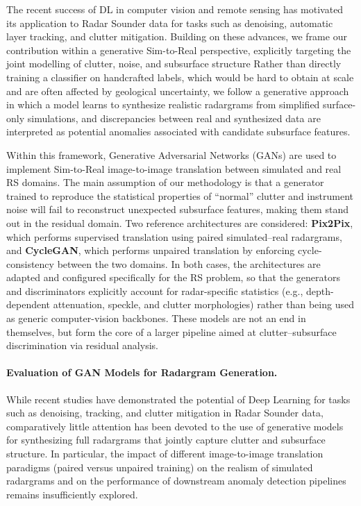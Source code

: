 The recent success of DL in computer vision and remote sensing has motivated its application to Radar Sounder data for tasks such as denoising, automatic layer tracking, and clutter mitigation.
Building on these advances, we frame our contribution within a generative Sim-to-Real perspective, explicitly targeting the joint modelling of clutter, noise, and subsurface structure
Rather than directly training a classifier on handcrafted labels, which would be hard to obtain at scale and are often affected by geological uncertainty, we follow a generative approach in which a model learns to synthesize realistic radargrams from simplified surface-only simulations, and discrepancies between real and synthesized data are interpreted as potential anomalies associated with candidate subsurface features.

Within this framework, Generative Adversarial Networks (GANs)\cite{Goodfellow_2014} are used to implement Sim-to-Real image-to-image translation between simulated and real RS domains.
The main assumption of our methodology is that a generator trained to reproduce the statistical properties of \enquote{normal} clutter and instrument noise will fail to reconstruct unexpected subsurface features, making them stand out in the residual domain.
Two reference architectures are considered: \textbf{Pix2Pix}\cite{Isola_2017}, which performs supervised translation using paired simulated–real radargrams, and \textbf{CycleGAN}\cite{Zhu_2017}, which performs unpaired translation by enforcing cycle-consistency between the two domains.
In both cases, the architectures are adapted and configured specifically for the RS problem, so that the generators and discriminators explicitly account for radar-specific statistics (e.g., depth-dependent attenuation, speckle, and clutter morphologies) rather than being used as generic computer-vision backbones.
These models are not an end in themselves, but form the core of a larger pipeline aimed at clutter–subsurface discrimination via residual analysis.

\paragraph{Evaluation of GAN Models for Radargram Generation.}
\label{sec:problem}
While recent studies have demonstrated the potential of Deep Learning for tasks such as denoising,  tracking, and clutter mitigation in Radar Sounder data, comparatively little attention has been devoted to the use of generative models for synthesizing full radargrams that jointly capture clutter and subsurface structure.
In particular, the impact of different image-to-image translation paradigms (paired versus unpaired training) on the realism of simulated radargrams and on the performance of downstream anomaly detection pipelines remains insufficiently explored.

